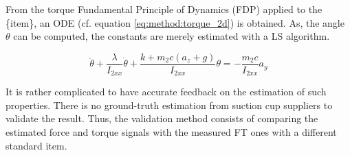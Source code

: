 \documentclass[/home/francois/latex/report/main.tex]{subfiles}
\begin{document}
From the torque Fundamental Principle of Dynamics (FDP) applied to the \{item\}, an \ac{ODE} (cf. equation \ref{eq:method:torque_2d}) is obtained. As, the angle $\theta$ can be computed, the constants are merely estimated with a \ac{LS} algorithm.

\begin{equation}
  \label{eq:method:torque_2d}
 \ddot{\theta} + \frac{\lambda}{I_{2xx}} \dot{\theta} + \frac{k + m_2 c (a_z + g)}{I_{2xx}} \theta = - \frac{m_2 c}{I_{2xx}} a_y
\end{equation}

It is rather complicated to have accurate feedback on the estimation of such properties. There is no ground-truth estimation from suction cup suppliers to validate the result. Thus, the validation method consists of comparing the estimated force and torque signals with the measured \ac{FT} ones with a different standard item.
\end{document}
